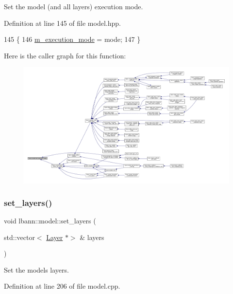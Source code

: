 Set the model (and all layers\textquotesingle{}) execution mode. 

Definition at line 145 of file model.\+hpp.


\begin{DoxyCode}
145                                                       \{
146     \hyperlink{classlbann_1_1model_a2166e2aad256a335ace3bdcae5da2614}{m\_execution\_mode} = mode;
147   \}
\end{DoxyCode}
Here is the caller graph for this function\+:\nopagebreak
\begin{figure}[H]
\begin{center}
\leavevmode
\includegraphics[width=350pt]{classlbann_1_1model_a375372b5b864ffbc4eaa0963f6939f65_icgraph}
\end{center}
\end{figure}
\mbox{\label{classlbann_1_1model_a95fb74f678f69b763d51b2ce987c8fde}} 
\subsubsection{\texorpdfstring{set\+\_\+layers()}{set\_layers()}}
{\footnotesize\ttfamily void lbann\+::model\+::set\+\_\+layers (\begin{DoxyParamCaption}\item[{std\+::vector$<$ \hyperlink{classlbann_1_1Layer}{Layer} $\ast$$>$ \&}]{layers }\end{DoxyParamCaption})}

Set the model\textquotesingle{}s layers. 

Definition at line 206 of file model.\+cpp.


